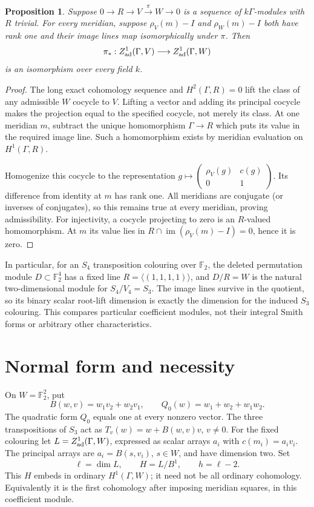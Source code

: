 \documentclass[11pt]{article}
\newtheorem{proposition}[theorem]{Proposition}
\newcommand{\F}{\mathbb F}
\newcommand{\im}{\operatorname{im}}
\begin{document}
\begin{proposition}\label{prop:radical}
Suppose $0\to R\to V\xrightarrow{\pi}W\to0$ is a sequence of
$k\Gamma$-modules with $R$ trivial. For every meridian, suppose
$\rho_V(m)-I$ and $\rho_W(m)-I$ both have rank one and their image
lines map isomorphically under $\pi$. Then
\[
 \pi_*:Z^1_{\rm ad}(\Gamma,V)\longrightarrow
             Z^1_{\rm ad}(\Gamma,W)
\]
is an isomorphism over every field $k$.
\end{proposition}
\begin{proof}
The long exact cohomology sequence and $H^2(\Gamma,R)=0$ lift
the class of any admissible $W$ cocycle to $V$. Lifting a vector
and adding its principal cocycle makes the projection equal to
the specified cocycle, not merely its class. At one meridian $m$,
subtract the unique homomorphism $\Gamma\to R$ which puts its
value in the required image line. Such a homomorphism exists by
meridian evaluation on $H^1(\Gamma,R)$.

Homogenize this cocycle to the representation
$g\mapsto\left(\begin{smallmatrix}\rho_V(g)&c(g)\\0&1\end{smallmatrix}\right)$.
Its difference from identity at $m$ has rank one. All meridians
are conjugate (or inverses of conjugates), so this remains true
at every meridian, proving admissibility. For injectivity, a
cocycle projecting to zero is an $R$-valued homomorphism. At $m$
its value lies in $R\cap\im(\rho_V(m)-I)=0$, hence it is zero.
\end{proof}

In particular, for an $S_4$ transposition colouring over $\F_2$,
the deleted permutation module $D\subset\F_2^4$ has a fixed line
$R=\langle(1,1,1,1)\rangle$, and $D/R=W$ is the natural
two-dimensional module for $S_4/V_4=S_3$. The image lines survive
in the quotient, so its binary scalar root-lift dimension is
exactly the dimension for the induced $S_3$ colouring. This
compares particular coefficient modules, not their integral
Smith forms or arbitrary other characteristics.

\section{Normal form and necessity}

On $W=\F_2^2$, put
\[
 B(w,v)=w_1v_2+w_2v_1,\qquad
 Q_0(w)=w_1+w_2+w_1w_2.
\]
The quadratic form $Q_0$ equals one at every nonzero vector.
The three transpositions of $S_3$ act as
$T_v(w)=w+B(w,v)v$, $v\ne0$.
For the fixed colouring let $L=Z^1_{\rm ad}(\Gamma,W)$, expressed
as scalar arrays $a_i$ with $c(m_i)=a_i v_i$. The principal arrays
are $a_i=B(s,v_i)$, $s\in W$, and have dimension two. Set
\[
                    \ell=\dim L,\qquad H=L/B^1,\qquad h=\ell-2.
\]
This $H$ embeds in ordinary $H^1(\Gamma,W)$; it need not be all
ordinary cohomology. Equivalently it is the first cohomology
after imposing meridian squares, in this coefficient module.
\end{document}
